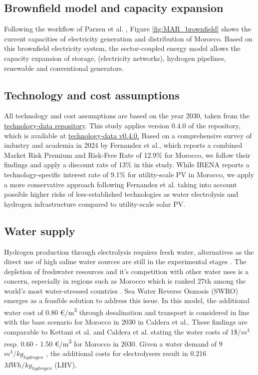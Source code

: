 \documentclass[5p,numafflabel]{elsarticle}
\providecommand{\DIFaddtex}[1]{{\protect\color{blue}\uwave{#1}}} %
\providecommand{\DIFdeltex}[1]{{\protect\color{red}\sout{#1}}}                      %
\providecommand{\DIFaddbegin}{} %
\providecommand{\DIFaddend}{} %
\providecommand{\DIFdelbegin}{} %
\providecommand{\DIFdelend}{} %
\providecommand{\DIFadd}[1]{\texorpdfstring{\DIFaddtex{#1}}{#1}} %
\providecommand{\DIFdel}[1]{\texorpdfstring{\DIFdeltex{#1}}{}} %
\newcommand{\DIFscaledelfig}{0.5}
\newlength{\DIFdelgraphicswidth} %
\newlength{\DIFdelgraphicsheight} %
\newcommand{\DIFaddincludegraphics}[2][]{{\color{blue}\fbox{\DIFOincludegraphics[#1]{#2}}}} %
\newcommand{\DIFdelincludegraphics}[2][]{%
\sbox{\DIFdelgraphicsbox}{\DIFOincludegraphics[#1]{#2}}%
\settoboxwidth{\DIFdelgraphicswidth}{\DIFdelgraphicsbox} %
\settoboxtotalheight{\DIFdelgraphicsheight}{\DIFdelgraphicsbox} %
\scalebox{\DIFscaledelfig}{%
\parbox[b]{\DIFdelgraphicswidth}{\usebox{\DIFdelgraphicsbox}\\[-\baselineskip] \rule{\DIFdelgraphicswidth}{0em}}\llap{\resizebox{\DIFdelgraphicswidth}{\DIFdelgraphicsheight}{%
\setlength{\unitlength}{\DIFdelgraphicswidth}%
\begin{picture}(1,1)%
\thicklines\linethickness{2pt} %
{\color[rgb]{1,0,0}\put(0,0){\framebox(1,1){}}}%
{\color[rgb]{1,0,0}\put(0,0){\line( 1,1){1}}}%
{\color[rgb]{1,0,0}\put(0,1){\line(1,-1){1}}}%
\end{picture}%
}\hspace*{3pt}}} %
} %
\DeclareRobustCommand{\DIFaddbegin}{\DIFOaddbegin \let\includegraphics\DIFaddincludegraphics} %
\DeclareRobustCommand{\DIFaddend}{\DIFOaddend \let\includegraphics\DIFOincludegraphics} %
\DeclareRobustCommand{\DIFdelbegin}{\DIFOdelbegin \let\includegraphics\DIFdelincludegraphics} %
\DeclareRobustCommand{\DIFdelend}{\DIFOaddend \let\includegraphics\DIFOincludegraphics} %
\begin{document}
\subsection*{Brownfield model and capacity expansion}
\label{brownfield_model}
Following the workflow of Parzen et al. \cite{Parzen2023}, Figure \ref{fig:MAR_brownfield} shows the current capacities of electricity generation and distribution of Morocco. Based on this brownfield electricity system, the sector-coupled energy model allows the capacity expansion of storage, (electricity networks), hydrogen pipelines, renewable and conventional generators.

\subsection*{Technology and cost assumptions}
\label{subsec:tech_assump}
All technology and cost assumptions are based on the year 2030, taken from the \href{https://github.com/pypsa/technology-data}{technology-data repository}. This study applies version 0.4.0 of the repository, which is available at \href{https://github.com/PyPSA/technology-data/blob/v0.4.0/outputs/costs_2030.csv}{technology-data v0.4.0.}
Based on a comprehensive survey of industry and academia in 2024 by Fernandez et al.\cite{Fernandez2024}, which reports a combined Market Risk Premium and Risk-Free Rate of 12.9\% for Morocco, we follow their findings and apply a discount rate of 13\% in this study. While IRENA\cite{IRENA2023} reports a technology-specific interest rate of 9.1\% for utility-scale PV in Morocco, we apply a more conservative approach following Fernandez et al.\cite{Fernandez2024} taking into account possible higher risks of less-established technologies as water electrolysis and hydrogen infrastructure compared to utility-scale solar PV.



\subsection*{Water supply}
\label{subsec:water_supply}
Hydrogen production through electrolysis requires fresh water, alternatives as the direct use of high saline water sources are still in the experimental stages \cite{Tong2020}. The depletion of freshwater resources and it's competition with other water uses is a concern, especially in regions such as Morocco which is ranked 27th among the world's most water-stressed countries \cite{Maddocks2015}. 
Sea Water Reverse Osmosis (SWRO) emerges as a feasible solution to address this issue. In this model, the additional water cost of 0.80 €/\si{\cubic\metre} through desalination and transport is considered in line with the base scenario for Morocco in 2030 in Caldera et al.\cite{Caldera2020}. These findings are comparable to Kettani et al.\cite{Kettani2020} and Caldera et al.\cite{Caldera2016} stating the water costs of 1\$/$m^3$ resp. 0.60 - 1.50 €/\si{\cubic\metre} for Morocco in 2030. Given a water demand of 9~\DIFdelbegin \DIFdel{$m^3/kg_{hydrogen}$
}\DIFdelend \DIFaddbegin \DIFadd{$l/kg_{hydrogen}$
}\DIFaddend \cite{Hampp2023}, the additional costs for electrolysers result in 0.216~$MWh/kg_{hydrogen}$ (LHV).
\end{document}
